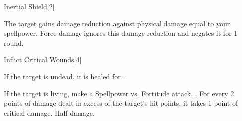\begin{spellsection}{Inertial Shield}[2]
    \begin{spellheader}
    \end{spellheader}
    \begin{spellcontent}
        \begin{spelltargetinginfo}
        \end{spelltargetinginfo}
        \begin{spelleffects}
            \spelleffect The target gains damage reduction against physical damage equal to your spellpower. Force damage ignores this damage reduction and negates it for 1 round.
            \spelldur \durshort
        \end{spelleffects}
    \end{spellcontent}
    \begin{spellfooter}
        \miscastexplode
    \end{spellfooter}
\end{spellsection}

\begin{spellsection}{Inflict Critical Wounds}[4]
    \begin{spellheader}
    \end{spellheader}
    \begin{spellcontent}
        \begin{spelltargetinginfo}
        \end{spelltargetinginfo}
        \begin{spelleffects}
            \spelleffect If the target is undead, it is healed for .
            \begin{spellattacktriggered}{If the target is living, make a Spellpower vs. Fortitude attack.}
                \spellsuccess {}. For every 2 points of damage dealt in excess of the target's hit points, it takes 1 point of critical damage.
                \spellfailure Half damage.
            \end{spellattacktriggered}
        \end{spelleffects}
    \end{spellcontent}
    \begin{spellfooter}
        \miscastrandom
    \end{spellfooter}
\end{spellsection}

